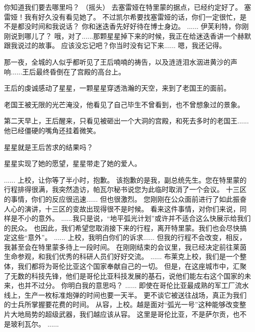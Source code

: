 \documentclass[openany]{book}
\begin{document}
\begin{dialogue}
     你知道我们要去哪里吗？
     （摇头）
     去塞雷娅在特里蒙的据点，已经约定好了。
     塞雷娅！我有好久没有看见她了。
     不过凯尔希要找塞雷娅的话，你们一定很忙，是不是都没时间和我说话？
     你和迷迭香先好好待在博士身边。
     ......
     伊芙利特，你刚刚说到哪儿了？
     哦，对了......那颗星星掉下来的时候，我正在给迷迭香讲一个赫默跟我说过的故事。
     应该没忘记吧？你当时没有记下来......
     嗯，我还记得。
\end{dialogue}
\par

{
    那一夜，全城的人似乎都听见了王后喃喃的祷告，以及涟涟泪水洇进黄沙的声响......王后最终昏倒在了宫殿的高台上。\par
    王后的虔诚感动了星星，一颗星星穿透浩瀚的天空，来到了老国王的面前。\par
    老国王被无限的光芒淹没，他看见了自己毕生不曾看到，也不曾想象过的景象。\par
    第二天早上，王后醒来，只看见被砸出一个大洞的宫殿，和死去多时的老国王......他已经僵硬的嘴角还挂着微笑。\par
    星星就是王后苦求的结果吗？\par
    \begin{center} 星星实现了她的愿望，星星带走了她的爱人。\end{center}
}
\par

\begin{dialogue}
     ......
     上校，让你等了半小时，抱歉。
     该抱歉的是我，副总统先生。您在特里蒙的行程排得很满，我突然造访，帕瓦尔秘书说您为此临时取消了一个会议。
     十三区的事情，你们的反应很迅速......
     但也很激烈。
     您刚刚在公众面前进行了如此振奋人心的演讲，十三区的变故出现得很不是时候。
     看来这件事情，对你们来说，同样是不小的意外。
     ......我只是说，“地平弧光计划”或许并不适合这么快展示给我们的民众。
     也因此，我们希望您取消接下来的行程，离开特里蒙。我们也会尽快搞定这些“意外”。
     ......
     上校，我明白你们的诉求......
     但我的行程不会改变，相反，我甚至会在特里蒙多待上一段时间。
     在刚刚结束的会议里，我已经决定前往莱茵生命参观，和我们优秀的科研人员们好好交流。
     ......
     布莱克上校，我们是一个整体，我们都将为哥伦比亚这个国家奉献自己的一切。
     但是，在这座城市中，汇聚了无数的科技先锋，他们是哥伦比亚科技发展的基石，说他们能左右这个国家的未来，也并不过分。
     你明白我的意思吗？
     ......
     即使在哥伦比亚最成熟的军工厂流水线上，生产一枚标准炮弹的时间也要一天半。
     更不谈它被送往战场，真正为我们的士兵所掌握要花费的时间。
     从容，上校。越是面对“弧光一号”这种能够改变整片大地局势的超级武器，我们越应该从容。
     这里是哥伦比亚，不是萨尔贡，也不是玻利瓦尔。
     ......
\end{dialogue}
\end{document}
